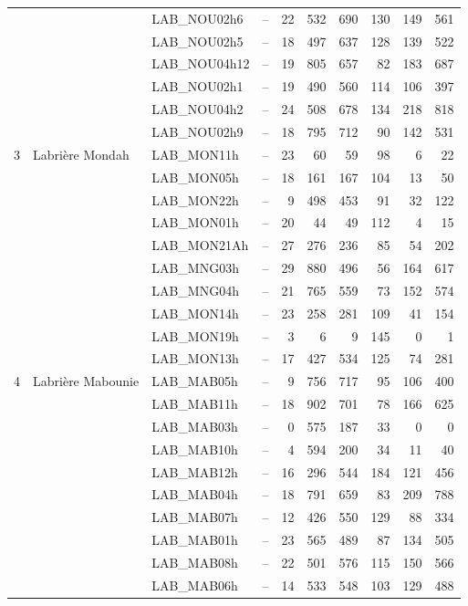\documentclass[conference,a4paper]{IEEEtran}
\begin{document}
\begin{table}[!t]
\begin{tabular}{@{}r l l r r r r r r r@{}}
 &  & LAB\_NOU02h6 & -- & 22 & 532 & 690 & 130 & 149 & 561\\
 &  & LAB\_NOU02h5 & -- & 18 & 497 & 637 & 128 & 139 & 522\\
 &  & LAB\_NOU04h12 & -- & 19 & 805 & 657 & 82 & 183 & 687\\
 &  & LAB\_NOU02h1 & -- & 19 & 490 & 560 & 114 & 106 & 397\\
 &  & LAB\_NOU04h2 & -- & 24 & 508 & 678 & 134 & 218 & 818\\
 &  & LAB\_NOU02h9 & -- & 18 & 795 & 712 & 90 & 142 & 531\\
\midrule
3 & Labri\`ere Mondah & LAB\_MON11h & -- & 23 & 60 & 59 & 98 & 6 & 22\\
 &  & LAB\_MON05h & -- & 18 & 161 & 167 & 104 & 13 & 50\\
 &  & LAB\_MON22h & -- & 9 & 498 & 453 & 91 & 32 & 122\\
 &  & LAB\_MON01h & -- & 20 & 44 & 49 & 112 & 4 & 15\\
 &  & LAB\_MON21Ah & -- & 27 & 276 & 236 & 85 & 54 & 202\\
 &  & LAB\_MNG03h & -- & 29 & 880 & 496 & 56 & 164 & 617\\
 &  & LAB\_MNG04h & -- & 21 & 765 & 559 & 73 & 152 & 574\\
 &  & LAB\_MON14h & -- & 23 & 258 & 281 & 109 & 41 & 154\\
 &  & LAB\_MON19h & -- & 3 & 6 & 9 & 145 & 0 & 1\\
 &  & LAB\_MON13h & -- & 17 & 427 & 534 & 125 & 74 & 281\\
\midrule
4 & Labri\`ere Mabounie & LAB\_MAB05h & -- & 9 & 756 & 717 & 95 & 106 & 400\\
 &  & LAB\_MAB11h & -- & 18 & 902 & 701 & 78 & 166 & 625\\
 &  & LAB\_MAB03h & -- & 0 & 575 & 187 & 33 & 0 & 0\\
 &  & LAB\_MAB10h & -- & 4 & 594 & 200 & 34 & 11 & 40\\
 &  & LAB\_MAB12h & -- & 16 & 296 & 544 & 184 & 121 & 456\\
 &  & LAB\_MAB04h & -- & 18 & 791 & 659 & 83 & 209 & 788\\
 &  & LAB\_MAB07h & -- & 12 & 426 & 550 & 129 & 88 & 334\\
 &  & LAB\_MAB01h & -- & 23 & 565 & 489 & 87 & 134 & 505\\
 &  & LAB\_MAB08h & -- & 22 & 501 & 576 & 115 & 150 & 566\\
 &  & LAB\_MAB06h & -- & 14 & 533 & 548 & 103 & 129 & 488\\

\end{tabular}
\end{table}
\end{document}
